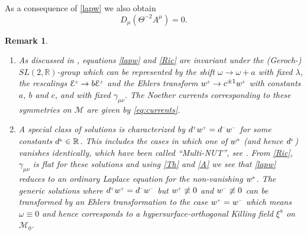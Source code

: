 \documentclass[a4paper,10pt,reqno]{amsart}
\newcommand{\cE}{\mathcal{E}}
\newcommand{\cM}{\mathcal{M}}
\theoremstyle{plain}
\newtheorem{remark}[thm]{Remark}
\renewcommand{\P}[1]{{{#1}^{\hspace{-.5pt}\scaleto{+}{4pt}}}}
\newcommand{\M}[1]{{{#1}^{\hspace{-.5pt}\scaleto{-}{4pt}}}}
\newcommand{\PM}[1]{{{#1}^{\hspace{-.5pt}\scaleto{\pm}{3.5pt}}}}
\newcommand{\MP}[1]{{{#1}^{\hspace{-.5pt}\scaleto{\mp}{3.5pt}}}}
\numberwithin{equation}{section}
\begin{document}
As a consequence of \eqref{lapw} we also obtain 
\begin{equation}
D_{\mu}( \Theta^{-2} A^{\mu}) = 0. 
\end{equation}

\begin{remark}~
\begin{enumerate}
\item
As discussed in \cite[Sect. 5]{gibbons:hawking:1979}, equations \eqref{lapw} and \eqref{Ric} are invariant under the (Geroch-) $SL(2,\mathbb{R})$-group \cite{1971JMP....12..918G} which can be represented by the shift $\omega \rightarrow \omega + a$ with fixed $\lambda$, the rescalings $\PM{\cE} \rightarrow b \PM{\cE}$ and the Ehlers transform $\PM{w} \rightarrow c^{\pm 1} \PM{w}$ with constants $a$, $b$ and $c$, and with fixed $\gamma_{\mu\nu}$. The Noether currents corresponding to these symmetries on $\cM$ are given by \eqref{eq:currents}. 
\item
A special class of solutions is characterized by $\P{d} \P{w} = \M{d} \M{w}$ for some constants $\PM{d} \in {\mathbb{R}}$. This includes the cases in which one of $\PM{w}$ (and hence $\MP{d}$) vanishes identically, which have been called ``Multi-NUT'', see \cite[(3.19)]{gibbons:hawking:1979}. From \eqref{Ric}, $\gamma_{\mu\nu}$ is flat for these solutions and using \eqref{Th} and \eqref{A} we see that \eqref{lapw} reduces to an ordinary Laplace equation for the non-vanishing $\PM{w}$.  The generic solutions where $\P{d} \P{w} = \M{d} \M{w}$ but $\P{w} \not\equiv 0$ and $\M{w} \not\equiv 0$ can be transformed by an Ehlers transformation to the case $ \P{w} = \M{w}$ which means $\omega \equiv 0$ and hence corresponds to a hypersurface-orthogonal Killing field $\xi^{a}$ on $\cM_0$.
\end{enumerate}
\end{remark}
\end{document}
